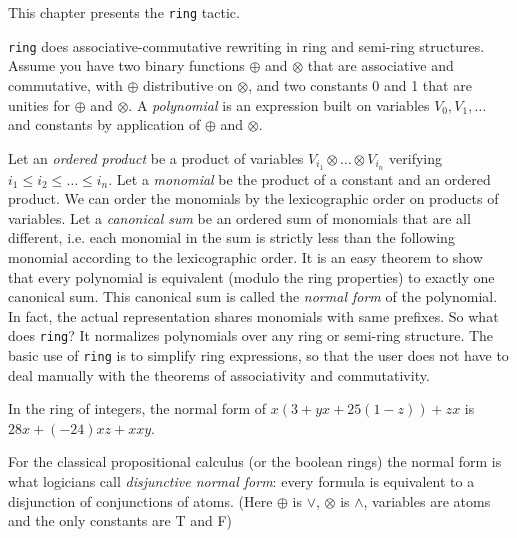 \label{ring}

This chapter presents  the \texttt{ring} tactic.



\texttt{ring} does associative-commutative rewriting in ring and semi-ring
structures. Assume you have two binary functions $\oplus$ and $\otimes$
that are associative and commutative, with $\oplus$ distributive on
$\otimes$, and two constants 0 and 1 that are unities for $\oplus$ and
$\otimes$. A \textit{polynomial} is an expression built on variables $V_0, V_1,
\dots$ and constants by application of $\oplus$ and $\otimes$.

Let an {\it ordered product} be a product of variables $V_{i_1}
\otimes \ldots \otimes V_{i_n}$ verifying $i_1 \le i_2 \le \dots \le
i_n$. Let a \textit{monomial} be the product of a constant and an
ordered product.  We can order the monomials by the lexicographic
order on products of variables. Let a \textit{canonical sum} be an
ordered sum of monomials that are all different, i.e. each monomial in
the sum is strictly less than the following monomial according to the
lexicographic order. It is an easy theorem to show that every
polynomial is equivalent (modulo the ring properties) to exactly one
canonical sum. This canonical sum is called the \textit{normal form}
of the polynomial. In fact, the actual representation shares monomials
with same prefixes. So what does \texttt{ring}? It normalizes
polynomials over any ring or semi-ring structure. The basic use of
\texttt{ring} is to simplify ring expressions, so that the user does
not have to deal manually with the theorems of associativity and
commutativity.

\begin{Examples}
\item In the ring of integers, the normal form of 
$x (3 + yx + 25(1 - z)) + zx$ is $28x + (-24)xz + xxy$.
\item For the classical propositional calculus (or the boolean rings)
  the normal form is what logicians call \textit{disjunctive normal
    form}: every formula is equivalent to a disjunction of
  conjunctions of atoms. (Here $\oplus$ is $\vee$, $\otimes$ is
  $\wedge$, variables are atoms and the only constants are T and F)
\end{Examples}

